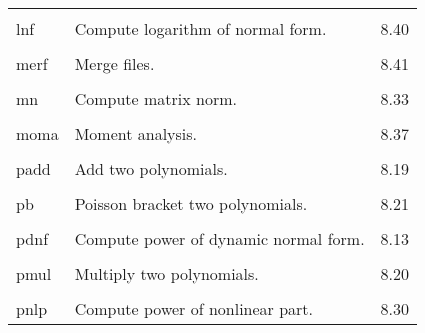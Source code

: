 \begin{center}
\begin{tabular}{lll}
\vspace{-3mm}& &\\
\hspace{1.5em}lnf    &           Compute logarithm of normal form.    &
\hspace{2em}8.40\\
\vspace{-3mm}& &\\
\hspace{1.5em}merf    &           Merge files.    &  \hspace{2em}8.41\\
\vspace{-3mm}& &\\
\hspace{1.5em}mn      &           Compute matrix norm.       &   \hspace{2em}8.33\\
\vspace{-3mm}& &\\
\hspace{1.5em}moma      &         Moment analysis.  &   \hspace{2em}8.37\\
\vspace{-3mm}& &\\
\hspace{1.5em}padd    &           Add two polynomials.       &   \hspace{2em}8.19\\
\vspace{-3mm}& &\\
\hspace{1.5em}pb      &         Poisson bracket two polynomials. &  \hspace{2em}8.21\\
\vspace{-3mm}& &\\
\hspace{1.5em}pdnf    &    Compute power of dynamic normal form.&  \hspace{2em}8.13\\
\vspace{-3mm}& &\\
\hspace{1.5em}pmul    &           Multiply two polynomials.   &    \hspace{2em}8.20\\
\vspace{-3mm}& &\\
\hspace{1.5em}pnlp    &           Compute power of nonlinear part. & \hspace{2em}8.30\\

\end{tabular}
\end{center}

